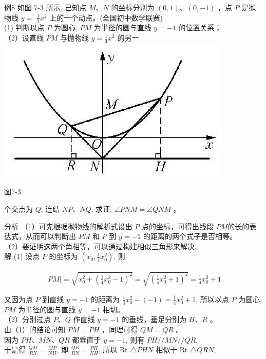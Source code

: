 \documentclass[10pt]{article}
\begin{document}
例8 如图 7-3 所示, 已知点 $M 、 N$ 的坐标分别为 $(0,1) 、(0,-1)$ ，点 $P$ 是抛物线 $y=$ $\frac{1}{4} x^{2}$ 上的一个动点。(全国初中数学联赛)\\
(1) 判断以点 $P$ 为圆心, $P M$ 为半径的圆与直线 $y=-1$ 的位置关系；\\
（2）设直线 $P M$ 与抛物线 $y=\frac{1}{4} x^{2}$ 的另一\\
\includegraphics[max width=\textwidth, center]{2024_10_30_1bf34f7aeb61f11d11d3g-098}

图7-3

个交点为 $Q$, 连结 $N P 、 N Q$, 求证: $\angle P N M=\angle Q N M$ 。

分析 （1）可先根据抛物线的解析式设出 $P$ 点的坐标，可得出线段 $P M$的长的表达式，从而可以判断出 $P M$ 和 $P$ 到 $y=-1$ 的距离的两个式子是否相等。\\
（2）要证明这两个角相等，可以通过构建相似三角形来解决.\\
解 (1) 设点 $P$ 的坐标为 $\left(x_{0}, \frac{1}{4} x_{0}^{2}\right)$, 则

\begin{align*}
|P M|=\sqrt{x_{0}^{2}+\left(\frac{1}{4} x_{0}^{2}-1\right)^{2}}=\sqrt{\left(\frac{1}{4} x_{0}^{2}+1\right)^{2}}=\frac{1}{4} x_{0}^{2}+1
\end{align*}

又因为点 $P$ 到直线 $y=-1$ 的距离为 $\frac{1}{4} x_{0}^{2}-(-1)=\frac{1}{4} x_{0}^{2}+1$, 所以以点 $P$ 为圆心, $P M$ 为半径的圆与直线 $y=-1$ 相切。\\
（2）分别过点 $P 、 Q$ 作直线 $y=-1$ 的垂线，垂足分别为 $H 、 R$ 。\\
由（1）的结论可知 $P M=P H$ ，同理可得 $Q M=Q R$ 。\\
因为 $P H 、 M N 、 Q R$ 都垂直于 $y=-1$, 则有 $P H / / M N / / Q R$.\\
于是得 $\frac{Q M}{R N}=\frac{M P}{N H}$, 即 $\frac{Q R}{R N}=\frac{P H}{N H}$, 所以 Rt $\triangle P H N$ 相似于 Rt $\triangle Q R N$,
\end{document}
